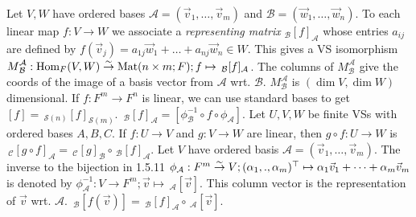  Let $V,W$ have ordered bases $\mathcal{A} = (\vec{v}_{1}, \dots, \vec{v}_{m})$ and $\mathcal{B} = (\vec{w}_{1}, \dots, \vec{w}_{n})$. To each linear map $f : V \to W$ we associate a \emph{representing matrix} $_{\mathcal{B}}[f]_{\mathcal{A}}$ whose entries $a_{ij}$ are defined by $f(\vec{v}_{j}) = a_{1j}\vec{w}_{1} + \dots + a_{nj}\vec{w}_{n} \in W$. This gives a VS isomorphism ${\textstyle M}^{\mathcal{A}}_{\mathcal{B}} : \text{Hom}_{F}(V, W) \stackrel{\sim}{\to} \text{Mat}(n \times m; F); f \mapsto \,_{\mathcal{B}}[f]_{\mathcal{A}}$.
The columns of ${\textstyle M}^{\mathcal{A}}_{\mathcal{B}}$ give the coords of the image of a basis vector from $\mathcal{A}$ wrt. $\mathcal{B}$. ${\textstyle M}^{\mathcal{A}}_{\mathcal{B}}$ is $(\dim V, \dim W)$ dimensional.
If $f : F^{m} \to F^{n}$ is linear, we can use standard bases to get $[f] = \,_{\mathcal{S}(n)}[f]_{\mathcal{S}(m)}$. $\,_{\mathcal{B}}[f]_{\mathcal{A}} = [\phi_{\mathcal{B}}^{-1} \circ f \circ \phi_{\mathcal{A}}]$.
 Let $U, V, W$ be finite VSs with ordered bases $A, B, C$. If $f : U \to V$ and $g : V \to W$ are linear, then $g \circ f : U \to W$ is $\,_{\mathcal{C}}[g \circ f]_{\mathcal{A}} = \,_{\mathcal{C}}[g]_{\mathcal{B}} \circ \,_{\mathcal{B}}[f]_{\mathcal{A}}$.
 Let $V$ have ordered basis $\mathcal{A} = (\vec{v}_{1}, \dots, \vec{v}_{m})$. The inverse to the bijection in 1.5.11 $\phi_{\mathcal{A}} : F^{m} \stackrel{\sim}{\to} V; (\alpha_{1}, ., \alpha_{m})^{\top} \mapsto \alpha_{1}\vec{v}_{1} + \dots + \alpha_{m}\vec{v}_{m}$ is denoted by $\phi_{\mathcal{A}}^{-1} : V \to F^{m}; \vec{v} \mapsto \,_{\mathcal{A}}[\vec{v}]$. This column vector is the representation of $\vec{v}$ wrt. $\mathcal{A}$.
 $\,_{\mathcal{B}}[f(\vec{v})] = \,_{\mathcal{B}}[f]_{\mathcal{A}} \circ \,_{\mathcal{A}}[\vec{v}]$.
